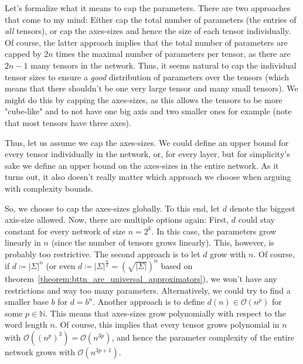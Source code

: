 \documentclass[../../main.tex]{subfiles}
\begin{document}

    Let's formalize what it means to cap the parameters. There are two approaches that come to my mind: Either cap the total number of parameters (the entries of \emph{all} tensors), or cap the axes-sizes and hence the size of each tensor individually. Of course, the latter approach implies that the total number of parameters are capped by $2n$ times the maximal number of parameters per tensor, as there are $2n-1$ many tensors in the network. Thus, it seems natural to cap the individual tensor sizes to ensure a \emph{good} distribution of parameters over the tensors (which means that there shouldn't be one very large tensor and many small tensors). We might do this by capping the axes-sizes, as this allows the tensors to be more "cube-like" and to not have one big axis and two smaller ones for example (note that most tensors have three axes).

    Thus, let us assume we cap the axes-sizes. We could define an upper bound for every tensor individually in the network, or, for every layer, but for simplicity's sake we define an upper bound on the axes-sizes in the entire network. As it turns out, it also doesn't really matter which approach we choose when arguing with complexity bounds.

    So, we choose to cap the axes-sizes globally. To this end, let $d$ denote the biggest axis-size allowed. Now, there are multiple options again: First, $d$ could stay constant for every network of size $n = 2^k$. In this case, the parameters grow linearly in $n$ (since the number of tensors grows linearly). This, however, is probably too restrictive. The second approach is to let $d$ grow with $n$. Of course, if $d \coloneqq |\Sigma|^n$ (or even $d \coloneqq |\Sigma|^{\frac{n}{2}} = \left(\sqrt{|\Sigma|}\right)^n$ based on theorem~\ref{theorem:bttn_are_universal_approximators}), we won't have any restrictions and way too many parameters. Alternatively, we could try to find a smaller base $b$ for $d = b^n$. Another approach is to define $d(n) \in \mathcal{O}(n^p)$ for some $p \in \mathbb{N}$. This means that axes-sizes grow polynomially with respect to the word length $n$. Of course, this implies that every tensor grows polynomial in $n$ with $\mathcal{O}((n^p)^3) = \mathcal{O}(n^{3p})$, and hence the parameter complexity of the entire network grows with $\mathcal{O}(n^{3p+1})$.
\end{document}
